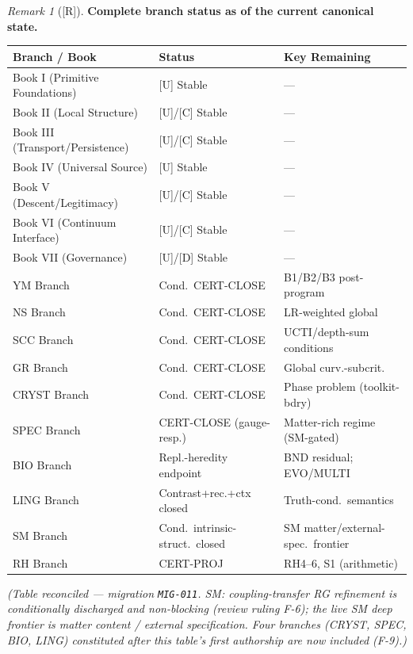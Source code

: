 \documentclass[12pt,oneside]{amsbook}
\theoremstyle{plain}
\theoremstyle{definition}
\theoremstyle{remark}
\newtheorem{remark}[theorem]{Remark}
\newcommand{\status}[1]{\textup{[#1]}}
\begin{document}
\begin{remark}[\status{R}]
\textbf{Complete branch status as of the current canonical state.}

\renewcommand{\arraystretch}{1.3}
\begin{center}
\begin{tabular}{|l|l|l|}
\hline
\textbf{Branch / Book} & \textbf{Status} & \textbf{Key Remaining} \\
\hline
Book I (Primitive Foundations) & [U] Stable & --- \\
Book II (Local Structure) & [U]/[C] Stable & --- \\
Book III (Transport/Persistence) & [U]/[C] Stable & --- \\
Book IV (Universal Source) & [U] Stable & --- \\
Book V (Descent/Legitimacy) & [U]/[C] Stable & --- \\
Book VI (Continuum Interface) & [U]/[C] Stable & --- \\
Book VII (Governance) & [U]/[D] Stable & --- \\
\hline
YM Branch & Cond.\ CERT-CLOSE & B1/B2/B3 post-program \\
NS Branch & Cond.\ CERT-CLOSE & LR-weighted global \\
SCC Branch & Cond.\ CERT-CLOSE & UCTI/depth-sum conditions \\
GR Branch & Cond.\ CERT-CLOSE & Global curv.-subcrit. \\
CRYST Branch & Cond.\ CERT-CLOSE & Phase problem (toolkit-bdry) \\
SPEC Branch & CERT-CLOSE (gauge-resp.) & Matter-rich regime (SM-gated) \\
BIO Branch & Repl.-heredity endpoint & BND residual; EVO/MULTI \\
LING Branch & Contrast+rec.+ctx closed & Truth-cond.\ semantics \\
\hline
SM Branch & Cond.\ intrinsic-struct.\ closed & SM matter/external-spec.\ frontier \\
RH Branch & CERT-PROJ & RH4--6, S1 (arithmetic) \\
\hline
\end{tabular}
\end{center}

\emph{(Table reconciled --- migration \texttt{MIG-011}. SM: coupling-transfer
RG refinement is conditionally discharged and non-blocking (review ruling
F-6); the live SM deep frontier is matter content / external specification.
Four branches (CRYST, SPEC, BIO, LING) constituted after this table's first
authorship are now included (F-9).)}


\end{remark}
\end{document}
